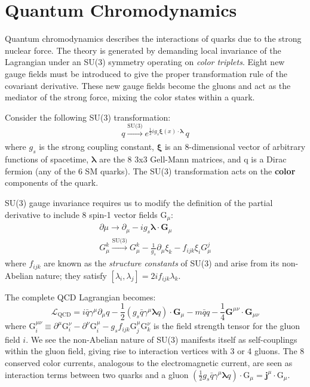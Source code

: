 \section{Quantum Chromodynamics} 

Quantum chromodynamics describes the interactions of quarks due to the strong nuclear force. The theory is generated by demanding local invariance of the Lagrangian under an SU(3) symmetry operating on \textit{color triplets}. Eight new gauge fields must be introduced to give the proper transformation rule of the covariant derivative. These new gauge fields become the gluons and act as the mediator of the strong force, mixing the color states within a quark.

Consider the following SU(3) transformation:
\begin{equation}
q \xrightarrow[]{\text{SU(3)}} e^{ \frac{1}{2} i g_{s} \bm{\xi}(x) \cdot \bm{\lambda}} \, q
\end{equation}
where $g_{s}$ is the strong coupling constant, $\bm{\xi}$ is an 8-dimensional vector of arbitrary functions of spacetime, $\bm{\lambda}$ are the 8 3x3 Gell-Mann matrices, and q is a Dirac fermion (any of the 6 SM quarks). The SU(3) transformation acts on the \textbf{color} components of the quark.

SU(3) gauge invariance requires us to modify the definition of the partial derivative to include 8 spin-1 vector fields $\bm{\mathrm{G}}_{\mu}$:
\begin{equation}
\begin{array}{l}
\partial{\mu} \rightarrow \partial_{\mu} - i g_{s} \bm{\lambda} \cdot \bm{G}_{\mu}\\
G^{k}_{\mu} \xrightarrow[]{\text{SU(3)}} G^{k}_{\mu} - \frac{1}{g_{s}}\partial_{\mu}\xi_{k} - f_{ijk}\xi_{i}G^{j}_{\mu}
\end{array}
\end{equation}
where $f_{ijk}$ are known as the \textit{structure constants} of SU(3) and arise from its non-Abelian nature; they satisfy $[\lambda_{i},\lambda_{j}] = 2if_{ijk}\lambda_{k}$.

The complete QCD Lagrangian becomes:
\begin{equation}
\mathcal{L}_{\mathrm{QCD}} =
i \bar{q} \gamma^{\mu} \partial_{\mu} q
-  \frac{1}{2} (g_{s} \bar{q} \gamma^{\mu} \bm{\lambda} q) \cdot \textbf{G}_{\mu}
- m \bar{q} q
- \frac{1}{4} \textbf{G}^{\mu\nu} \cdot \textbf{G}_{\mu\nu}
\end{equation}
where $\mathrm{G}^{\mu\nu}_{i} \equiv \partial^{\mu} \mathrm{G}^{\nu}_{i} - \partial^{\nu} \mathrm{G}^{\mu}_{i} - g_{s} f_{ijk} \mathrm{G}^{\mu}_{j} \mathrm{G}^{\nu}_{k}$ is the field strength tensor for the gluon field $i$. We see the non-Abelian nature of SU(3) manifests itself as self-couplings within the gluon field, giving rise to interaction vertices with 3 or 4 gluons. The 8 conserved color currents, analogous to the electromagnetic current, are seen as interaction terms between two quarks and a gluon $(\frac{1}{2} g_{s} \bar{q} \gamma^{\mu} \bm{\lambda} q) \cdot \bm{\mathrm{G}}_{\mu} = \bm{j}^{\mu} \cdot \bm{\mathrm{G}}_{\mu}$.


